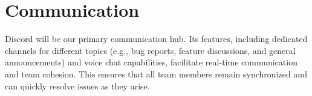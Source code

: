 \documentclass[10pt,titlepage]{article}
\begin{document}
	\section*{Communication}
	Discord will be our primary communication hub. Its features, including dedicated channels for different topics (e.g., bug reports, feature discussions, and general announcements) and voice chat capabilities, facilitate real-time communication and team cohesion. This ensures that all team members remain synchronized and can quickly resolve issues as they arise.
\end{document}

